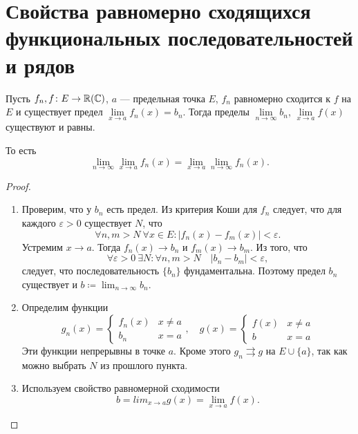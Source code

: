 \section{Свойства равномерно сходящихся функциональных последовательностей и рядов}
\begin{prop}
\item Пусть $ f_n, f\colon E \to \mathbb{R}(\mathbb{C})$, $ a$ --- предельная точка  $ E$,  $ f_n$ равномерно сходится к  $ f$ на $ E$ и существует предел $ \lim\limits_{x \to  a}f_n(x) = b_n$.
	Тогда пределы $ \lim\limits_{n \to  \infty} b_n$, $ \lim\limits_{x \to a} f(x)$ существуют и равны. 
	
	То есть \[
		\lim_{n \to \infty} \lim_{x \to  a} f_n(x) = \lim_{x \to  a} \lim_{n \to \infty} f_n(x)
	.\] 
	\begin{proof}
			$ $
	    \begin{enumerate}
	        \item Проверим, что у $ b_n$ есть предел. Из критерия Коши для $ f_n$ следует, что для каждого  $ \varepsilon >0$ существует $ N$, что 
				 \[
					 \forall n, m > N ~ \forall x \in E \colon \lvert f_n(x) - f_m(x) \rvert < \varepsilon 
				.\] 
				Устремим $ x \to  a$. Тогда $ f_n(x) \to b_n$ и $ f_m(x) \to b_m$. Из того, что 
				 \[
				\forall \varepsilon  > 0 ~ \exists N\colon \forall n, m > N \quad \lvert b_n - b_m \rvert < \varepsilon 
				,\] 
				следует, что  последовательность $ \{b_n\}$ фундаментальна. Поэтому предел  $ b_n$ существует и  $ b\coloneqq \lim_{n \to \infty} b_n $.
			\item Определим функции 
				\[
					g_n(x) = 
					\begin{cases}
						f_n(x) & x \ne a \\
						b_n & x = a
					\end{cases}
					,
					\quad
					g(x) = 
					\begin{cases}
						f(x) & x \ne a \\
						b & x = a
					\end{cases}
				\] 
				Эти функции непрерывны в точке $ a$. Кроме этого  $ g_n \rightrightarrows g$ на $ E \cup \{a\}$, так как можно выбрать $ N$ из прошлого пункта.
			\item Используем свойство равномерной сходимости %
				\[
					b = lim_{x \to  a} g(x) = \lim_{x \to a} f(x) 
				.\] 
	    \end{enumerate} 
	\end{proof}
\end{prop}
% 
